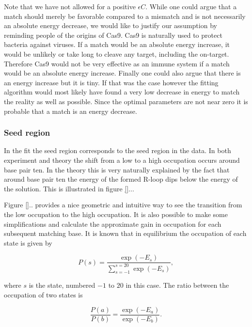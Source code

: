 Note that we have not allowed for a positive $\epsilon C$. While one could argue that a match should merely be favorable compared to a mismatch and is not necessarily an absolute energy decrease, we would like to justify our assumption by reminding people of the origins of Cas9. Cas9 is naturally used to protect bacteria against viruses. If a match would be an absolute energy increase, it would be unlikely or take long to cleave any target, including the on-target. Therefore Cas9 would not be very effective as an immune system if a match would be an absolute energy increase. Finally one could also argue that there is an energy increase but it is tiny. If that was the case however the fitting algorithm would most likely have found a very low decrease in energy to match the reality as well as possible. Since the optimal parameters are not near zero it is probable that a match is an energy decrease. 

\subsubsection{Seed region}
\label{sec:minmodelresultsseedregion}

In the fit the seed region corresponds to the seed region in the data. In both experiment and theory the shift from a low to a high occupation occurs around base pair ten. In the theory this is very naturally explained by the fact that around base pair ten the energy of the formed R-loop dips below the energy of the solution. This is illustrated in figure \ref{}... %


Figure \ref{}.. %
provides a nice geometric and intuitive way to see the transition from the low occupation to the high occupation. It is also possible to make some simplifications and calculate the approximate gain in occupation for each subsequent matching base. It is known that in equilibrium the occupation of each state is given by

\begin{equation}
P(s) = \frac{\exp(-E_s)}{\sum_{s=-1}^{s=20}\exp(-E_s)},
\end{equation}

where $s$ is the state, numbered $-1$ to $20$ in this case. The ratio between the occupation of two states is

\begin{equation}
\frac{P(a)}{P(b)} = \frac{\exp(-E_a)}{\exp(-E_b)}.
\end{equation}

